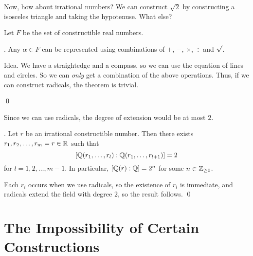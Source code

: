 Now, how about irrational numbers? We can construct \(\sqrt{2}\) by constructing a isosceles triangle and taking the hypotenuse. What else?

Let \(F\) be the set of constructible real numbers.

\thm. Any \(\alpha \in F\) can be represented using combinations of \(+\), \(-\), \(\times\), \(\div\) and \(\sqrt{\vphantom{l}}\).

\pf Idea. We have a straightedge and a compass, so we can use the equation of lines and circles. So we can \textit{only} get a combination of the above operations. Thus, if we can construct radicals, the theorem is trivial.

\begin{center}

    \usetikzlibrary {decorations.pathmorphing, decorations.pathreplacing, decorations.shapes}
\end{center}

\vspace*{-10pt}

\qed

Since we can use radicals, the degree of extension would be at most \(2\).

\cor. Let \(r\) be an irrational constructible number. Then there exists \(r_1, r_2, \dots, r_m = r \in \mathbb{R}\) such that
\[
    [\mathbb{Q}(r_1, \dots, r_l) : \mathbb{Q}(r_1, \dots, r_{l+1})] = 2
\]
for \(l = 1, 2, \dots, m - 1\). In particular, \([\mathbb{Q}(r) : \mathbb{Q}] = 2^n\) for some \(n \in \mathbb{Z}_{\geq 0}\).

\pf Each \(r_i\) occurs when we use radicals, so the existence of \(r_i\) is immediate, and radicals extend the field with degree \(2\), so the result follows. \qed

\section*{The Impossibility of Certain Constructions}

